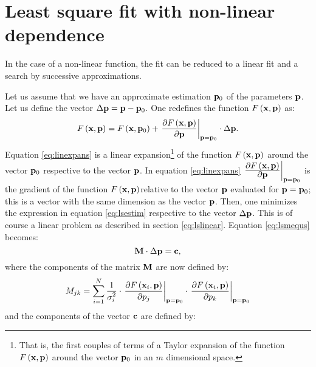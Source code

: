\documentclass[twoside]{book}
\begin{document}
\section{Least square fit with non-linear dependence}
\label{sec:lsfnonlin} In the case of a non-linear function, the
fit can be reduced to a linear fit and a search by successive
approximations.

Let us assume that we have an approximate estimation ${\bf p}_0$
of the parameters ${\bf p}$. Let us define the vector $\Delta{\bf
p}={\bf p}-{\bf p}_0$. One redefines the function $F\left({\bf
x},{\bf p}\right)$ as:
\begin{equation}
\label{eq:linexpans}
  F\left({\bf x},{\bf p}\right)=F\left({\bf x},{\bf p}_0\right)
  +\left.{\displaystyle\partial F\left({\bf x},{\bf
  p}\right)\over\displaystyle\partial{\bf p}}\right|_{{\bf p}={\bf
  p}_0}\cdot \Delta{\bf p}.
\end{equation}
Equation \ref{eq:linexpans} is a linear expansion\footnote{That
is, the first couples of terms of a Taylor expansion of the
function $F\left({\bf x},{\bf p}\right)$ around the vector ${\bf
p}_0$ in an $m$ dimensional space.} of the function $F\left({\bf
x},{\bf p}\right)$ around the vector ${\bf p}_0$ respective to the
vector ${\bf p}$. In equation \ref{eq:linexpans}
$\left.{\displaystyle\partial F\left({\bf x},{\bf
p}\right)\over\displaystyle\partial{\bf p}}\right|_{{\bf p}={\bf
p}_0}$ is the gradient of the function $F\left({\bf x},{\bf
p}\right)$relative to the vector ${\bf p}$ evaluated for ${\bf
p}={\bf p}_0$; this is a vector with the same dimension as the
vector ${\bf p}$. Then, one minimizes the expression in equation
\ref{eq:lsestim} respective to the vector $\Delta{\bf p}$. This is
of course a linear problem as described in section
\ref{eq:lslinear}. Equation \ref{eq:lsmequs} becomes:
\begin{equation}
\label{eq:lslinequs}
  {\bf M}\cdot\Delta{\bf p}={\bf c},
\end{equation}
where the components of the matrix ${\bf M}$ are now defined by:
\begin{equation}
\label{eq:lsmatrix}
  M_{jk}=\sum_{i=1}^N {\displaystyle
  1\over\displaystyle\sigma_i^2}\cdot\left.{\displaystyle\partial F\left({\bf x}_i,{\bf
p}\right)\over\displaystyle\partial p_j}\right|_{{\bf p}={\bf
p}_0}\cdot\left.{\displaystyle\partial F\left({\bf x}_i,{\bf
p}\right)\over\displaystyle\partial p_k}\right|_{{\bf p}={\bf
p}_0}
\end{equation}
and the components of the vector ${\bf c}$ are defined by:
\end{document}
